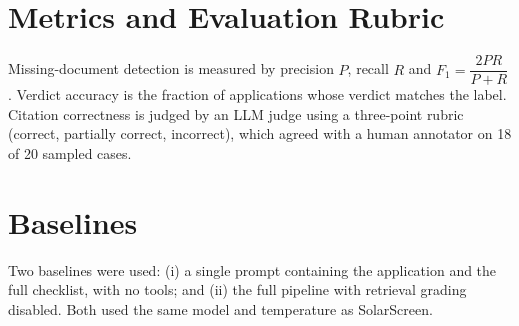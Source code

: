 \documentclass[12pt,a4paper,oneside]{report}
\newif\ifguidance
\newcommand{\guide}[1]{%
  \ifguidance
  \begin{tcolorbox}[enhanced,breakable,colback=guidebg,colframe=bmsblue,
    boxrule=0.6pt,arc=2pt,left=6pt,right=6pt,top=4pt,bottom=4pt,
    fonttitle=\bfseries\small,title={What to write here},
    before upper={\small\setstretch{1.1}}]
  #1
  \end{tcolorbox}
  \fi}
\newcommand{\dodont}[2]{%
  \ifguidance
  \begin{tcolorbox}[enhanced,breakable,sidebyside,sidebyside align=top seam,
    colback=dobg,colbacklower=dontbg,colframe=gray!60,boxrule=0.5pt,arc=2pt,
    lefthand ratio=0.5,left=5pt,right=5pt,top=4pt,bottom=4pt,
    fontupper=\small\setstretch{1.05},fontlower=\small\setstretch{1.05}]
  \textbf{\textcolor{ForestGreen}{\checkmark\ Do}}
  \begin{itemize}[leftmargin=12pt,itemsep=1pt,topsep=2pt]#1\end{itemize}
  \tcblower
  \textbf{\textcolor{BrickRed}{$\times$ Don't}}
  \begin{itemize}[leftmargin=12pt,itemsep=1pt,topsep=2pt]#2\end{itemize}
  \end{tcolorbox}
  \fi}
\newenvironment{sample}
  {\par\noindent{\footnotesize\bfseries\textcolor{BrickRed}{[SAMPLE --- replace with your own content]}}\par\color{samplecol}}
  {\par\medskip}
\begin{document}
\section{Metrics and Evaluation Rubric}
\guide{Define every metric precisely, with a formula where appropriate. If you use an LLM as a judge,
give the rubric and report agreement with human labels on a subset.}
\dodont{\item Define each metric before reporting it.
\item Validate the LLM judge against human labels.
}
{\item Do not rely only on ``the output looked good''.
}

\begin{sample}
Missing-document detection is measured by precision $P$, recall $R$ and
$F_1 = \dfrac{2PR}{P+R}$. Verdict accuracy is the fraction of applications whose verdict matches the
label. Citation correctness is judged by an LLM judge using a three-point rubric (correct, partially
correct, incorrect), which agreed with a human annotator on 18 of 20 sampled cases.
\end{sample}

\section{Baselines}
\guide{Compare against at least one simpler baseline, for example a single prompt with no tools or RAG
without grading.}
\dodont{\item Use the same model and data for baseline and system.
}
{\item Do not use a deliberately weak baseline.
}

\begin{sample}
Two baselines were used: (i) a single prompt containing the application and the full checklist,
with no tools; and (ii) the full pipeline with retrieval grading disabled. Both used the same model and
temperature as SolarScreen.
\end{sample}
\end{document}
